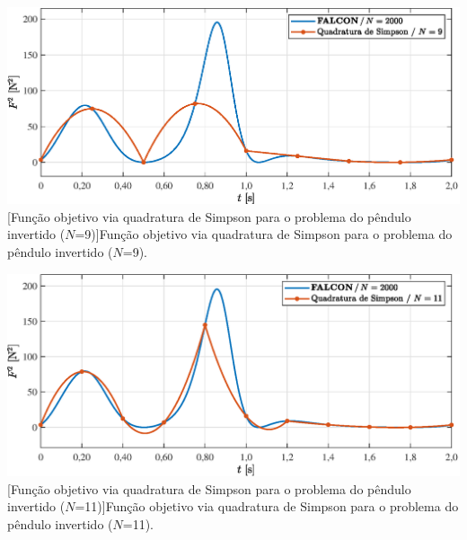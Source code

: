 \noindent	
\begin{minipage}{\textwidth}
	\vspace{\onelineskip}
	\centering
	\includegraphics[scale=0.7]{fig/resultados/penduloInvertido/obs/hersim/N=9}
	[Função objetivo via quadratura de Simpson para o problema do pêndulo invertido ($N$=9)]{Função objetivo via quadratura de Simpson para o problema do pêndulo invertido ($N$=9).}
	\label{fig:penduloInvertido:hersim:N=9}
	\vspace{\onelineskip}
\end{minipage}

\noindent	
\begin{minipage}{\textwidth}
	\vspace{\onelineskip}
	\centering
	\includegraphics[scale=0.7]{fig/resultados/penduloInvertido/obs/hersim/N=11}
	[Função objetivo via quadratura de Simpson para o problema do pêndulo invertido ($N$=11)]{Função objetivo via quadratura de Simpson para o problema do pêndulo invertido ($N$=11).}
	\label{fig:penduloInvertido:hersim:N=11}
	\vspace{\onelineskip}
\end{minipage}

